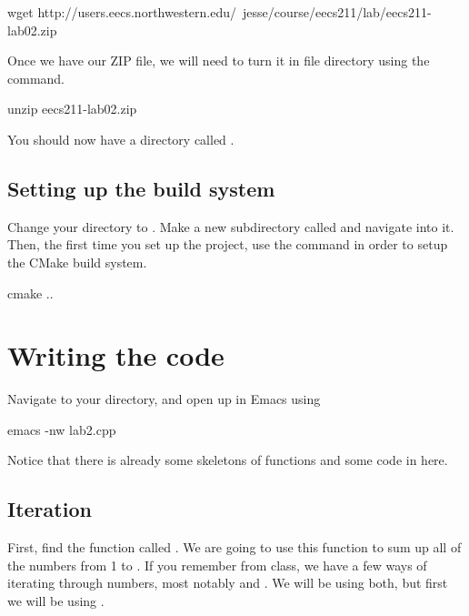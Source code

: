 \documentclass{tufte-handout}
\begin{document}
\begin{CmdLine}
  \prompt wget http://users.eecs.northwestern.edu/~jesse/course/eecs211/lab/eecs211-lab02.zip
\end{CmdLine}

Once we have our ZIP file, we will need to turn it in file directory using the  command.

\begin{CmdLine}
  \prompt unzip eecs211-lab02.zip
\end{CmdLine}

You should now have a directory called .

\subsection{Setting up the build system}
Change your directory to . Make a new subdirectory called  and navigate into it. Then, the first time you set up the project, use the command  in order to setup the CMake build system.
\begin{CmdLine}
  \prompt cmake ..
\end{CmdLine}

\section{Writing the code}
Navigate to your  directory, and open up  in Emacs using 
\begin{CmdLine}
  \prompt emacs -nw lab2.cpp 
\end{CmdLine}
Notice that there is already some skeletons of functions and some code in  here.

\subsection{Iteration}
First, find the function called .  We are going to use this function to sum up all of the numbers from 1 to .  If you remember from class, we have a few ways of iterating through numbers, most notably  and .  We will be using both, but first we will be using .
\end{document}
